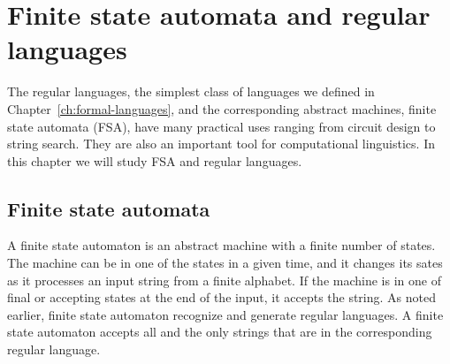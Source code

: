 \chapter{\label{ch:fsa}Finite state automata and regular languages}

The regular languages, the simplest class of languages
we defined in Chapter~\ref{ch:formal-languages},
and the corresponding abstract machines, finite state automata (FSA), 
have many practical uses ranging from circuit design to string search.
They are also an important tool for computational linguistics.
In this chapter we will study FSA and regular languages.



\section{Finite state automata}

A finite state automaton is an abstract machine with a finite number of states.
The machine can be in one of the states in a given time,
and it changes its sates as it processes an input string
from a finite alphabet.
If the machine is in one of final or accepting states at the end of the input,
it accepts the string.
As noted earlier, finite state automaton
recognize and generate regular languages.
A finite state automaton accepts all and the only strings
that are in the corresponding regular language.

